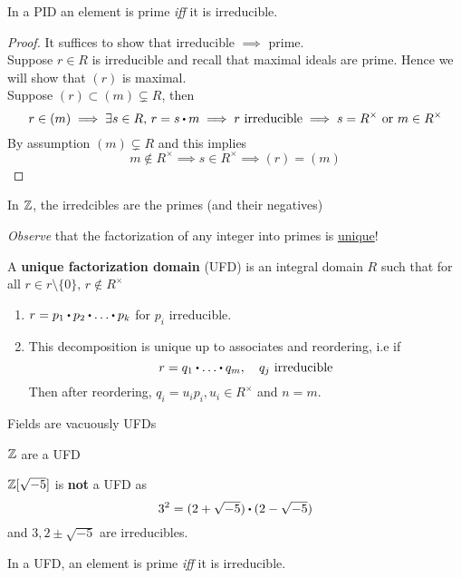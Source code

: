 \documentclass[../Main.tex]{subfiles}
\begin{document}
\begin{prop}
	In a PID an element is prime \textit{iff} it is irreducible.
\end{prop}
\begin{proof}
	It suffices to show that irreducible $\implies$ prime.\\
	Suppose $r\in R$ is irreducible and recall that maximal ideals are prime. Hence we will show that $(r)$ is maximal.\\
	Suppose $(r)\subset (m)\subsetneq R$, then
	\[r\in (m) \implies \exists s\in R,\, r=s\rdot m\implies r \text{ irreducible} \implies s=R^\times \text{ or } m\in R^\times\]
	By assumption $(m)\subsetneq R$ and this implies
	\[m\notin R^\times \implies s\in R^\times \implies (r) = (m)\]
\end{proof}
\begin{example}
	In $\mathbb{Z}$, the irredcibles are the primes (and their negatives)
\end{example}
\textit{Observe} that the factorization of any integer into primes is \underline{unique}!
\begin{dfn}[title = Unique Factorization Domain]
	A \textbf{unique factorization domain} (UFD) is an integral domain $R$ such that for all $r\in r\setminus \{0\},\, r\notin R^\times$
	\begin{enumerate}
		\item $r=p_1\rdot p_2\rdot \dots\rdot p_k$ for $p_i$ irreducible.
		\item This decomposition is unique up to associates and reordering, i.e if 
		\[r=q_1\rdot \dots \rdot q_m,\quad q_j \text{ irreducible}\]
		Then after reordering, $q_i=u_ip_i, u_i\in R^\times$ and $n=m$.
	\end{enumerate}
\end{dfn}
\begin{example}
	Fields are vacuously UFDs
\end{example}
\begin{example}
	$\mathbb{Z}$ are a UFD
\end{example}
\begin{example}
	$\mathbb{Z}[\sqrt{-5}]$ is \textbf{not} a UFD as
	\[3^2=(2+\sqrt{-5})\rdot (2-\sqrt{-5})\]
	and $3,2\pm \sqrt{-5}$ are irreducibles.
\end{example}
\begin{prop}
	In a UFD, an element is prime \textit{iff} it is irreducible.
\end{prop}
\end{document}

